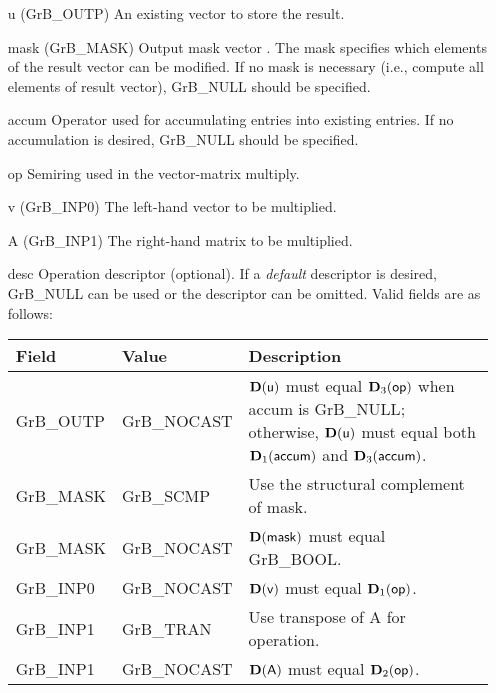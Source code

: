 \begin{itemize}[leftmargin=1.1in]
    \item[{\sf u}]    ({\sf GrB\_OUTP}) An existing vector to store the result.

    \item[{\sf mask}] ({\sf GrB\_MASK}) Output mask vector . The mask
    specifies which elements of the result vector can be modified.
    If no mask is necessary (i.e., compute all elements of result
    vector), {\sf GrB\_NULL} should be specified.

    \item[{\sf accum}]  Operator used for accumulating entries into existing
                         entries. If no accumulation is desired,
                        {\sf GrB\_NULL} should be specified.

    \item[{\sf op}]   Semiring used in the vector-matrix multiply.
    \item[{\sf v}]    ({\sf GrB\_INP0}) The left-hand vector to be multiplied.
    \item[{\sf A}]    ({\sf GrB\_INP1}) The right-hand matrix to be multiplied.

    \item[{\sf desc}]  Operation descriptor (optional). If a
    \emph{default} descriptor is desired, {\sf GrB\_NULL} can be
    used or the descriptor can be omitted. Valid fields are as follows: \\
    \begin{tabular}{llp{3in}}
    Field  & Value & Description \\
    \hline
    {\sf GrB\_OUTP} & {\sf GrB\_NOCAST} & $\bold{D}({\sf u})$ must equal $\bold{D}_3({\sf op})$
                                          when {\sf accum} is {\sf GrB\_NULL}; otherwise, $\bold{D}({\sf u})$
                                          must equal both $\bold{D}_1({\sf accum})$ and $\bold{D}_3({\sf accum})$.\\
    {\sf GrB\_MASK} & {\sf GrB\_SCMP}   & Use the structural complement of {\sf mask}. \\
    {\sf GrB\_MASK} & {\sf GrB\_NOCAST} & $\bold{D}({\sf mask})$ must equal {\sf GrB\_BOOL}. \\
    {\sf GrB\_INP0} & {\sf GrB\_NOCAST} & $\bold{D}({\sf v})$ must equal $\bold{D}_1({\sf op})$. \\
    {\sf GrB\_INP1} & {\sf GrB\_TRAN}   & Use transpose of {\sf A} for operation. \\
    {\sf GrB\_INP1} & {\sf GrB\_NOCAST} & $\bold{D}({\sf A})$ must equal $\bold{D}_2({\sf op})$. \\
    \end{tabular}
\end{itemize}

